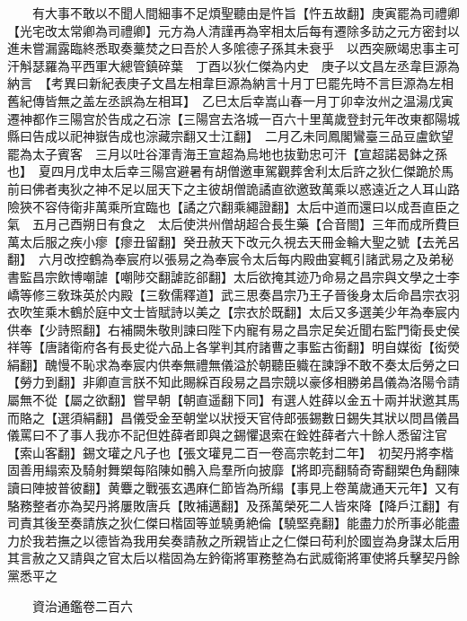 　　有大事不敢以不聞人間細事不足煩聖聽由是忤旨【忤五故翻】庚寅罷為司禮卿【光宅改太常卿為司禮卿】元方為人清謹再為宰相太后每有遷除多訪之元方密封以進未嘗漏露臨終悉取奏藳焚之曰吾於人多隂德子孫其未衰乎　以西突厥竭忠事主可汗斛瑟羅為平西軍大總管鎮碎葉　丁酉以狄仁傑為内史　庚子以文昌左丞韋巨源為納言　【考異曰新紀表庚子文昌左相韋巨源為納言十月丁巳罷先時不言巨源為左相舊紀傳皆無之盖左丞誤為左相耳】　乙巳太后幸嵩山春一月丁卯幸汝州之温湯戊寅遷神都作三陽宫於告成之石淙【三陽宫去洛城一百六十里萬歲登封元年改東都陽城縣曰告成以祀神嶽告成也淙藏宗翻又士江翻】　二月乙未同鳳閣鸞臺三品豆盧欽望罷為太子賓客　三月以吐谷渾青海王宣超為烏地也抜勤忠可汗【宣超諾曷鉢之孫也】　夏四月戊申太后幸三陽宫避暑有胡僧邀車駕觀葬舍利太后許之狄仁傑跪於馬前曰佛者夷狄之神不足以屈天下之主彼胡僧詭譎直欲邀致萬乘以惑遠近之人耳山路險狹不容侍衛非萬乘所宜臨也【譎之穴翻乘繩證翻】太后中道而還曰以成吾直臣之氣　五月己酉朔日有食之　太后使洪州僧胡超合長生藥【合音閤】三年而成所費巨萬太后服之疾小瘳【瘳丑留翻】癸丑赦天下改元久視去天冊金輪大聖之號【去羌呂翻】　六月改控鶴為奉宸府以張易之為奉宸令太后每内殿曲宴輒引諸武易之及弟秘書監昌宗飲博嘲謔【嘲陟交翻謔訖郤翻】太后欲掩其迹乃命易之昌宗與文學之士李嶠等修三敎珠英於内殿【三敎儒釋道】武三思奏昌宗乃王子晉後身太后命昌宗衣羽衣吹笙乘木鶴於庭中文士皆賦詩以美之【宗衣於既翻】太后又多選美少年為奉宸内供奉【少詩照翻】右補闕朱敬則諫曰陛下内寵有易之昌宗足矣近聞右監門衛長史侯祥等【唐諸衛府各有長史從六品上各掌判其府諸曹之事監古銜翻】明自媒衒【衒熒絹翻】醜慢不恥求為奉宸内供奉無禮無儀溢於朝聽臣軄在諫諍不敢不奏太后勞之曰【勞力到翻】非卿直言朕不知此賜綵百段易之昌宗競以豪侈相勝弟昌儀為洛陽令請屬無不從【屬之欲翻】嘗早朝【朝直遥翻下同】有選人姓薛以金五十兩并狀邀其馬而賂之【選須絹翻】昌儀受金至朝堂以狀授天官侍郎張錫數日錫失其狀以問昌儀昌儀罵曰不了事人我亦不記但姓薛者即與之錫懼退索在銓姓薛者六十餘人悉留注官【索山客翻】錫文瓘之凡子也【張文瓘見二百一卷高宗乾封二年】　初契丹將李楷固善用䌈索及騎射舞槊每陷陳如鶻入烏羣所向披靡【將即亮翻騎奇寄翻槊色角翻陳讀曰陣披普彼翻】黄麞之戰張玄遇麻仁節皆為所䌈【事見上卷萬歲通天元年】又有駱務整者亦為契丹將屢敗唐兵【敗補邁翻】及孫萬榮死二人皆來降【降戶江翻】有司責其後至奏請族之狄仁傑曰楷固等並驍勇絶倫【驍堅堯翻】能盡力於所事必能盡力於我若撫之以德皆為我用矣奏請赦之所親皆止之仁傑曰苟利於國豈為身謀太后用其言赦之又請與之官太后以楷固為左鈐衛將軍務整為右武威衛將軍使將兵擊契丹餘黨悉平之

　　資治通鑑卷二百六


    


 


 



